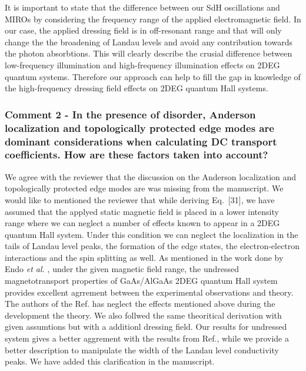 \documentclass{article}
\begin{document}
\begin{itemize}
{  It is important to state that the difference between our SdH oscillations and MIROs \cite{zudov01,mani02,zudov03,mani04} by considering the frequency range of the applied electromagnetic field. In our case, the applied dressing field is in off-resonant range and that will only change the the broadening of Landau levels and avoid any contribution towards the photon absorbtions. This will clearly describe the crusial difference between low-frequency illumination and high-frequency illumination effects on 2DEG quantum systems. Therefore our approach can help to fill the gap in knowledge of the high-frequency dressing field effects on 2DEG quantum Hall systems.
  }
\end{itemize}

\subsubsection*{Comment 2 -
\color{RoyalBlue} In the presence of disorder, Anderson localization and topologically protected edge modes are dominant considerations when calculating DC transport coefficients. How are these factors taken into account?
}

We agree with the reviewer that the discussion on the Anderson localization and topologically protected edge modes are was missing from the manuscript.
We would like to mentioned the reviewer that while deriving Eq.~[31], we have assumed that the applyed static magnetic field is placed in a lower intensity range where we can neglect a number of effects known to appear in a 2DEG quantum Hall system. Under this condition we can neglect the localization in the tails of Landau level peaks, the formation of the edge states, the electron-electron interactions and the spin splitting as well. As mentioned in the work done by Endo \textit{et al.} \cite{endo09}, under the given magnetic field range, the undressed magnetotransport properties of GaAs/AlGaAs 2DEG quantum Hall system provides excellent agrrement between the experimental observations and theory. The authors of the Ref.\cite{endo09} has neglect the effects mentioned above during the development the theory. We also follwed the same theoritical derivation with given assumtions but with a additionl dressing field. Our results for undressed system gives a better aggrement with the results from Ref.\cite{endo09}, while we provide a better description to manipulate the width of the Landau level conductivity peaks. We have added this clarification in the manuscript.
\end{document}
